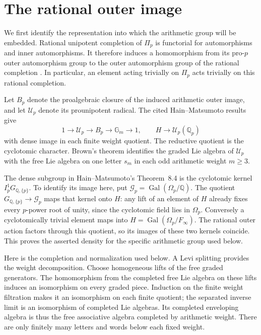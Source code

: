 \documentclass[11pt]{article}
\theoremstyle{definition}
\numberwithin{equation}{section}
\begin{document}
\section{The rational outer image}
\label{sec:rational-image}

We first identify the representation into which the arithmetic group
will be embedded. Rational unipotent completion of $\Pi_p$ is
functorial for automorphisms and inner automorphisms. It therefore
induces a homomorphism from its pro-$p$ outer automorphism group to
the outer automorphism group of the rational completion
\cite[Appendix A.6, A.9--A.10]{HainMatsumoto2001}.
In particular, an element acting trivially on $\Pi_p$ acts trivially
on this rational completion.

Let $B_p$ denote the proalgebraic closure of the induced arithmetic
outer image, and let $\mathcal U_p$ denote its prounipotent radical.
The cited Hain--Matsumoto results give
\begin{equation}
 1\longrightarrow\mathcal U_p\longrightarrow B_p
   \longrightarrow\mathbb G_m\longrightarrow1,
 \qquad H\longrightarrow\mathcal U_p(\mathbb Q_p)
\end{equation}
with dense image in each finite weight quotient. The reductive
quotient is the cyclotomic character. Brown's theorem \cite{Brown2012} identifies
the graded Lie algebra of $\mathcal U_p$ with the free Lie algebra
on one letter $s_m$ in each odd arithmetic weight $m\ge3$.

The dense subgroup in Hain--Matsumoto's Theorem~8.4 is the
cyclotomic kernel $I_p^1G_{\mathbb Q,\{p\}}$. To identify its image
here, put $\mathcal G_p=\operatorname{Gal}(\Omega_p/\mathbb Q)$.
The quotient $G_{\mathbb Q,\{p\}}\to\mathcal G_p$ maps that kernel
onto $H$: any lift of an element of $H$ already fixes every
$p$-power root of unity, since the cyclotomic field lies in
$\Omega_p$. Conversely a cyclotomically trivial element maps into
$H=\operatorname{Gal}(\Omega_p/F_\infty)$.
The rational outer action factors through this quotient, so its
images of these two kernels coincide. This proves the asserted
density for the specific arithmetic group used below.

Here is the completion and normalization used below. A Levi splitting
provides the weight decomposition. Choose homogeneous lifts of the
free graded generators. The homomorphism from the completed free Lie
algebra on these lifts induces an isomorphism on every graded piece.
Induction on the finite weight filtration makes it an isomorphism
on each finite quotient; the separated inverse limit is an isomorphism
of completed Lie algebras. Its completed enveloping algebra is thus
the free associative algebra completed by arithmetic weight.
There are only finitely many letters and words below each fixed weight.
\end{document}
